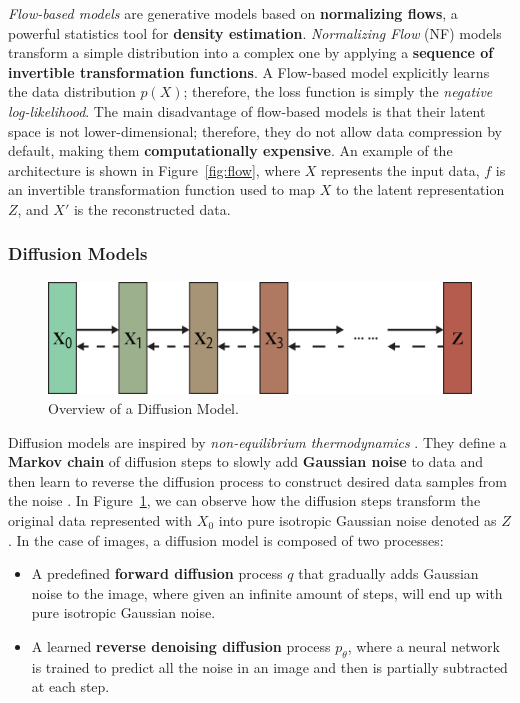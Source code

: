 \documentclass[preprint]{elsarticle}
\begin{document}
\emph{Flow-based models} \cite{weng2018flow} are generative models based on \textbf{normalizing flows}, a powerful statistics tool for \textbf{density estimation}.
\emph{Normalizing Flow} (NF) \cite{rezende2016variational} models transform a simple distribution into a complex one by applying a \textbf{sequence of invertible transformation functions}. 
A Flow-based model explicitly learns the data distribution $p(X)$; therefore, the loss function is simply the \emph{negative log-likelihood}.
The main disadvantage of flow-based models is that their latent space is not lower-dimensional; 
therefore, they do not allow data compression by default, making them \textbf{computationally expensive}. An example of the architecture is shown in Figure~\ref{fig:flow}, where $X$ represents the input data, $f$ is an invertible transformation function used to map $X$ to the latent representation $Z$, and $X'$ is the reconstructed data.  


\subsubsection{Diffusion Models} \label{sec:diff}

\begin{figure}[t]
	\centering
    \includegraphics[scale=0.8]{img/svg/DIFF.png}
    \caption{Overview of a Diffusion Model.}\label{fig:diff-arch}
\end{figure}


Diffusion models are inspired by \emph{non-equilibrium thermodynamics} \cite{V_n_2020}. 
They define a \textbf{Markov chain} of diffusion steps to slowly 
add \textbf{Gaussian noise} to data and then learn to reverse the diffusion process to construct desired data samples from the noise \cite{weng2021diffusion}. 
In Figure~\ref{fig:diff-arch}, we can observe how the diffusion steps transform the original data represented with $X_0$ into pure isotropic Gaussian noise denoted as $Z$. 
In the case of images, a diffusion model is composed of two processes:
\begin{itemize}
	\item A predefined \textbf{forward diffusion} process $q$ that gradually adds Gaussian noise to the image, where given an infinite amount of steps, will end up with pure isotropic Gaussian noise. 
	\item A learned \textbf{reverse denoising diffusion} process $p_\theta$, where a neural network is trained to predict all the noise in an image and then is partially subtracted at each step.
\end{itemize}
\end{document}
